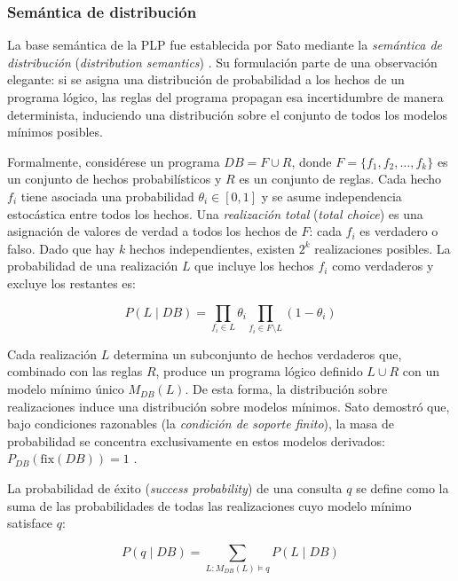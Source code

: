 \subsubsection{Semántica de distribución}

La base semántica de la PLP fue establecida por Sato mediante la \textit{semántica de distribución} (\textit{distribution semantics}) \cite{sato1995statistical}. Su formulación parte de una observación elegante: si se asigna una distribución de probabilidad a los hechos de un programa lógico, las reglas del programa propagan esa incertidumbre de manera determinista, induciendo una distribución sobre el conjunto de todos los modelos mínimos posibles.

Formalmente, considérese un programa $DB = F \cup R$, donde $F = \{f_1, f_2, \ldots, f_k\}$ es un conjunto de hechos probabilísticos y $R$ es un conjunto de reglas. Cada hecho $f_i$ tiene asociada una probabilidad $\theta_i \in [0, 1]$ y se asume independencia estocástica entre todos los hechos. Una \textit{realización total} (\textit{total choice}) es una asignación de valores de verdad a todos los hechos de $F$: cada $f_i$ es verdadero o falso. Dado que hay $k$ hechos independientes, existen $2^k$ realizaciones posibles. La probabilidad de una realización $L$ que incluye los hechos $f_i$ como verdaderos y excluye los restantes es:

\begin{equation}
    P(L \mid DB) = \prod_{f_i \in L} \theta_i \prod_{f_i \in F \setminus L} (1 - \theta_i)
    \label{eq:total-choice}
\end{equation}

Cada realización $L$ determina un subconjunto de hechos verdaderos que, combinado con las reglas $R$, produce un programa lógico definido $L \cup R$ con un modelo mínimo único $M_{DB}(L)$. De esta forma, la distribución sobre realizaciones induce una distribución sobre modelos mínimos. Sato demostró que, bajo condiciones razonables (la \textit{condición de soporte finito}), la masa de probabilidad se concentra exclusivamente en estos modelos derivados: $P_{DB}(\text{fix}(DB)) = 1$ \cite{sato1995statistical}.

La probabilidad de éxito (\textit{success probability}) de una consulta $q$ se define como la suma de las probabilidades de todas las realizaciones cuyo modelo mínimo satisface $q$:

\begin{equation}
    P(q \mid DB) = \sum_{L : M_{DB}(L) \models q} P(L \mid DB)
    \label{eq:success-probability}
\end{equation}

